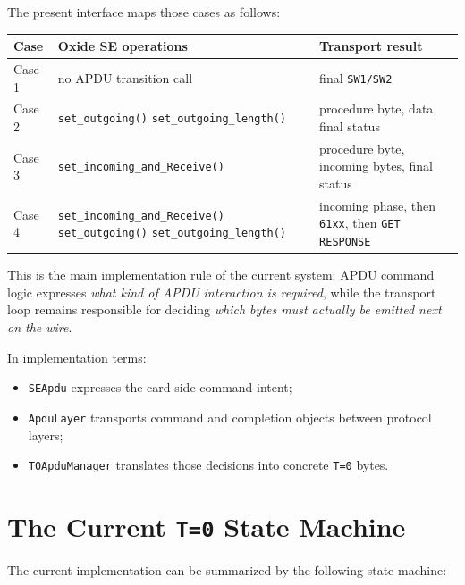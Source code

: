 The present interface maps those cases as follows:

\begin{center}
\begin{tabular}{|p{2.1cm}|p{6.0cm}|p{6.0cm}|}
\hline
\textbf{Case} & \textbf{Oxide SE operations} & \textbf{Transport result} \\
\hline
Case 1 & no APDU transition call & final \texttt{SW1/SW2} \\
\hline
Case 2 & \texttt{set\_outgoing()}\newline
         \texttt{set\_outgoing\_length()} &
         procedure byte, data, final status \\
\hline
Case 3 & \texttt{set\_incoming\_and\_Receive()} &
         procedure byte, incoming bytes, final status \\
\hline
Case 4 & \texttt{set\_incoming\_and\_Receive()}\newline
         \texttt{set\_outgoing()}\newline
         \texttt{set\_outgoing\_length()} &
         incoming phase, then \texttt{61xx}, then \texttt{GET RESPONSE} \\
\hline
\end{tabular}
\end{center}

This is the main implementation rule of the current system: APDU command
logic expresses \emph{what kind of APDU interaction is required}, while
the transport loop remains responsible for deciding \emph{which bytes
must actually be emitted next on the wire}.

In implementation terms:
\begin{itemize}
\item \texttt{SEApdu} expresses the card-side command intent;
\item \texttt{ApduLayer} transports command and completion objects
  between protocol layers;
\item \texttt{T0ApduManager} translates those decisions into concrete
  \texttt{T=0} bytes.
\end{itemize}

\section{The Current \texttt{T=0} State Machine}

The current implementation can be summarized by the following state
machine:

